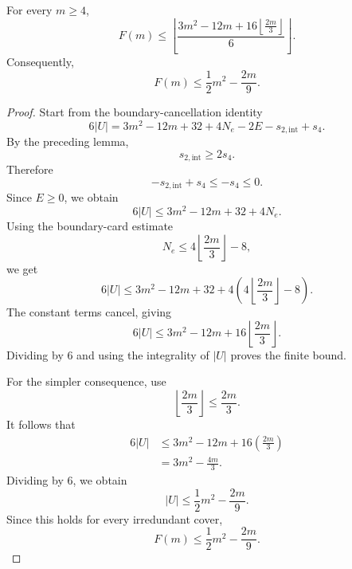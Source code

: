 \documentclass[10pt,a4paper]{amsart}
\begin{document}
	\begin{theorem}
		For every \(m\ge4\),
		\[
		{
			F(m)
			\le
			\left\lfloor
			\frac{
				3m^2-12m
				+
				16\left\lfloor\frac{2m}{3}\right\rfloor
			}{6}
			\right\rfloor.
		}
		\]
		Consequently,
		\[
		F(m)\le\frac12m^2-\frac{2m}{9}.
		\]
	\end{theorem}

	\begin{proof}
		Start from the boundary-cancellation identity
		\[
		6|U|
		=
		3m^2-12m+32+4N_e-2E-s_{2,\mathrm{int}}+s_4.
		\]
		By the preceding lemma,
		\[
		s_{2,\mathrm{int}}\ge 2s_4.
		\]
		Therefore
		\[
		-s_{2,\mathrm{int}}+s_4\le -s_4\le0.
		\]
		Since \(E\ge0\), we obtain
		\[
		6|U|
		\le
		3m^2-12m+32+4N_e.
		\]
		Using the boundary-card estimate
		\[
		N_e\le4\left\lfloor\frac{2m}{3}\right\rfloor-8,
		\]
		we get
		\[
		6|U|
		\le
		3m^2-12m+32
		+
		4\left(
		4\left\lfloor\frac{2m}{3}\right\rfloor-8
		\right).
		\]
		The constant terms cancel, giving
		\[
		6|U|
		\le
		3m^2-12m
		+
		16\left\lfloor\frac{2m}{3}\right\rfloor.
		\]
		Dividing by \(6\) and using the integrality of \(|U|\) proves the finite bound.
		
		For the simpler consequence, use
		\[
		\left\lfloor\frac{2m}{3}\right\rfloor
		\le
		\frac{2m}{3}.
		\]
		It follows that
		\[
		\begin{aligned}
			6|U|
			&\le
			3m^2-12m
			+
			16\left(\frac{2m}{3}\right)\\
			&=
			3m^2-\frac{4m}{3}.
		\end{aligned}
		\]
		Dividing by \(6\), we obtain
		\[
		|U|\le\frac12m^2-\frac{2m}{9}.
		\]
		Since this holds for every irredundant cover,
		\[
		F(m)\le\frac12m^2-\frac{2m}{9}.
		\]
	\end{proof}
\end{document}
